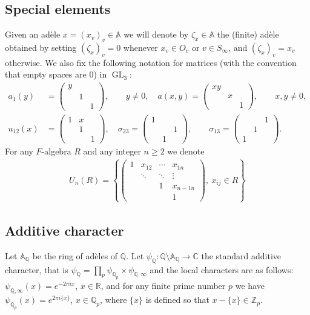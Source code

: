 \documentclass[a4paper,11pt]{amsart}
\theoremstyle{definition}
\newcommand{\A}{\mathbb{A}}
\newcommand{\R}{\mathbb{R}}
\newcommand{\Z}{\mathbb{Z}}
\newcommand{\Q}{\mathbb{Q}}
\newcommand{\gelle}{\operatorname{GL}}
\newcommand{\CC}{\mathbb{C}}
\begin{document}
\subsection{Special elements}
Given an ad\`ele  $x=(x_v)_v \in \A$ we will denote by $\zeta_x \in \A$ the (finite) ad\`ele obtained by setting $(\zeta_x)_v = 0$ whenever $x_v \in O_{v}$ or $v\in S_{\infty}$, and $(\zeta_x)_v = x_v$ otherwise. 
We also fix the following notation for matrices (with the convention that empty spaces are $0$) in $\gelle_3$:
\begin{align}
    a_1(y) &= \begin{pmatrix}
        y&&\\&1&\\&&1
    \end{pmatrix},\qquad y\neq 0,\quad 
    a(x,y)= \begin{pmatrix}
        xy&&\\&x&\\&&1
    \end{pmatrix}, \qquad x,y\neq 0,\nonumber\\
    u_{12}(x) &=\begin{pmatrix}
        1&x&\\&1&\\&&1
    \end{pmatrix},\quad
    \sigma_{23}=\begin{pmatrix}
        1&&\\&&1\\&1&
    \end{pmatrix}, \qquad \sigma_{13} = \begin{pmatrix}
        &&1\\&1&\\1&&
    \end{pmatrix}.\label{eq:u12}
\end{align}
For any $F$-algebra $R$ and any integer $n\geq 2$ we denote
\begin{align*}
    U_n(R) = \left\{\begin{pmatrix}
        1&x_{12}&\cdots &x_{1n}\\&\ddots&\ddots &\vdots\\&&1&x_{n-1n}\\&&&1 
    \end{pmatrix}, \ x_{ij} \in R\right\}
\end{align*}



\subsection{Additive character}Let $\A_{\Q}$ be the ring of adèles of $\Q$. Let $\psi_{\Q} \colon \Q\setminus \A_{\Q} \to \CC$ the standard additive character, that is $\psi_{\Q} = \prod_{p}\psi_{\Q_p} \times \psi_{\Q,\infty}$ and the local characters are as follows: 
$\psi_{\Q,\infty}(x) = e^{-2\pi ix}$, $x\in \R$, and for any finite prime number $p$ we have $\psi_{\Q_p}(x) = e^{2\pi i\{x\}}$, $x \in \Q_p$, where $\{x\}$ is defined so that $x-\{x\} \in \Z_p$.
\end{document}
